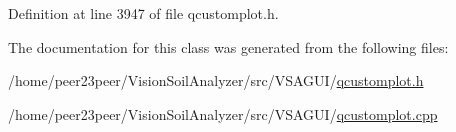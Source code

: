 Definition at line 3947 of file qcustomplot.\+h.



The documentation for this class was generated from the following files\+:\begin{DoxyCompactItemize}
\item 
/home/peer23peer/\+Vision\+Soil\+Analyzer/src/\+V\+S\+A\+G\+U\+I/\hyperlink{qcustomplot_8h}{qcustomplot.\+h}\item 
/home/peer23peer/\+Vision\+Soil\+Analyzer/src/\+V\+S\+A\+G\+U\+I/\hyperlink{qcustomplot_8cpp}{qcustomplot.\+cpp}\end{DoxyCompactItemize}
